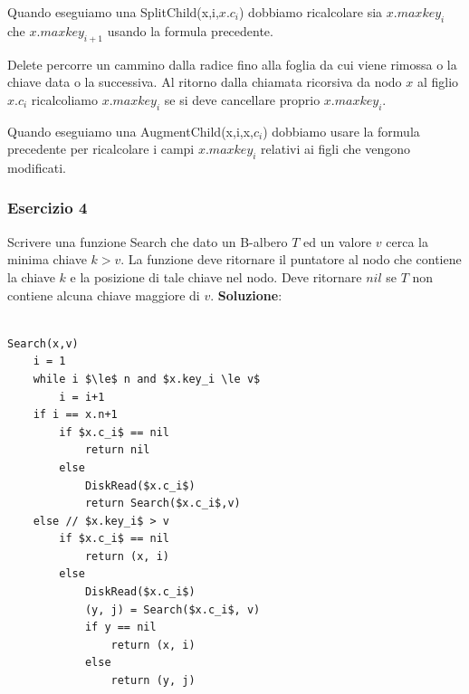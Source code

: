 Quando eseguiamo una SplitChild(x,i,$x.c_i$) dobbiamo ricalcolare sia $x.maxkey_i$ che $x.maxkey_{i+1}$ usando la formula precedente.

Delete percorre un cammino dalla radice fino alla foglia da cui viene rimossa o la chiave data o la successiva. Al ritorno dalla chiamata ricorsiva da nodo $x$ al figlio $x.c_i$ ricalcoliamo $x.maxkey_i$ se si deve cancellare proprio $x.maxkey_i$.

Quando eseguiamo una AugmentChild(x,i,x,$c_i$) dobbiamo usare la formula precedente per ricalcolare i campi $x.maxkey_i$ relativi ai figli che vengono modificati.

\subsubsection{Esercizio 4}

Scrivere una funzione Search che dato un B-albero $T$ ed un valore $v$ cerca la minima chiave $k>v$. La funzione deve ritornare il puntatore al nodo che contiene la chiave $k$ e la posizione di tale chiave nel nodo. Deve ritornare $nil$ se $T$ non contiene alcuna chiave maggiore di $v$.
\linebreak
\linebreak
\textbf{Soluzione}:

\begin{lstlisting}[mathescape=true]

Search(x,v)
	i = 1
	while i $\le$ n and $x.key_i \le v$
		i = i+1
	if i == x.n+1
		if $x.c_i$ == nil
			return nil
		else
			DiskRead($x.c_i$)
			return Search($x.c_i$,v)
	else // $x.key_i$ > v
		if $x.c_i$ == nil
			return (x, i)
		else
			DiskRead($x.c_i$)
			(y, j) = Search($x.c_i$, v)
			if y == nil
				return (x, i)
			else
				return (y, j)

\end{lstlisting}